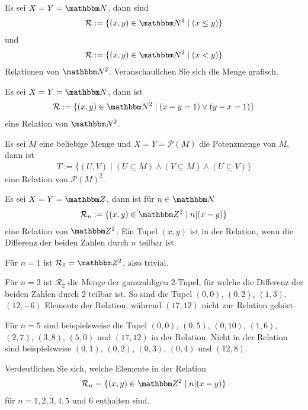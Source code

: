 \begin{Unit}[Beispiel] 
  Es sei $X = Y = \NN$, dann sind
  \begin{align}
    \mathcal{R} := \{ (x,y) \in \NN^2 \mid (x \leq y) \}
  \end{align}
  und
  \begin{align}
    \mathcal{R} := \{ (x,y) \in \NN^2 \mid (x < y) \}
  \end{align}
  Relationen von $\NN^2$. Veranschaulichen Sie sich die Menge grafisch.
\end{Unit}

\begin{Unit}[Beispiel] 
  Es sei $X = Y = \NN$, dann ist
  \begin{align}
    \mathcal{R}  := \{ (x,y) \in \NN^2 \mid (x - y = 1) \lor
      (y - x = 1) \} 
  \end{align} eine Relation von $\NN^2$.
\end{Unit}

\begin{Unit}[Beispiel] 
  Es sei $M$ eine beliebige Menge und $X = Y = \mathcal{P}(M)$ die Potenzmenge 
  von $M$, dann ist
  \begin{align}
    T := \{ (U,V) \mid (U \subseteq M) \land (V \subseteq M) \land (U \subseteq 
      V) \} 
  \end{align}
  eine Relation von $\mathcal{P}(M)^2$.
\end{Unit}

\begin{Unit}[Beispiel] 
  Es sei $X = Y = \ZZ$, dann ist für $n \in \NN$ 
  \begin{align}
    \mathcal{R}_n := \{ (x,y) \in \ZZ^2 \mid n|(x - y) \} 
  \end{align}
  eine Relation von $\ZZ^2$. Ein Tupel $(x,y)$ ist in der Relation, wenn die 
  Differenz der beiden Zahlen durch $n$ teilbar ist. 
  
  Für $n = 1$ ist $\mathcal{R}_1 = \ZZ^2$, also trivial. 
  
  Für $n = 2$ ist $\mathcal{R}_2$ die Menge der ganzzahligen 2-Tupel, für 
  welche die Differenz der beiden Zahlen durch 2 teilbar ist. So sind die 
  Tupel $(0,0)$, $(0,2)$, $(1,3)$, $(12,-6)$ Elemente der Relation, während 
  $(17,12)$ nicht zur Relation gehört. 
  
  Für $n = 5$ sind beispielsweise die Tupel $(0,0)$, $(0,5)$, $(0,10)$, 
  $(1,6)$, $(2,7)$, $(3,8)$, $(5,0)$ und $(17,12)$ in der Relation. Nicht in 
  der Relation sind beispielsweise $(0,1)$, $(0,2)$, $(0,3)$, $(0,4)$ und 
  $(12,8)$.

  Verdeutlichen Sie sich, welche Elemente in der Relation
  \begin{align}
    \mathcal{R}_n = \{ (x,y) \in \ZZ^2 \mid n|(x - y) \}
  \end{align}
  für $n = 1, 2, 3, 4, 5$ und $6$ enthalten sind.
\end{Unit}

